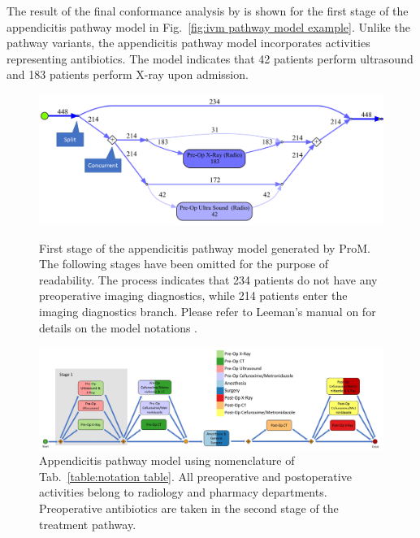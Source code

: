 The result of the final conformance analysis by  is shown for the first stage of the appendicitis
pathway model in Fig.~\ref{fig:ivm pathway model example}.
Unlike the pathway variants, the appendicitis pathway model incorporates activities representing antibiotics. The model indicates that 42 patients perform ultrasound and 183 patients perform X-ray upon admission. 

\begin{figure}[t]
\includegraphics[width=\textwidth]{images/ivm_appendicitis_first_stage_example.png}
\caption{First stage of the appendicitis pathway model generated by
  ProM. The following stages have been omitted for the purpose of
  readability.
  The process indicates that 234 patients do not have any preoperative
  imaging diagnostics, while 214 patients enter the imaging
  diagnostics branch.
  Please refer to Leeman's manual on  for details on the model notations \cite{leemansinductive}.}
\label{fig:ivm pathway model example}

\includegraphics[width=\textwidth]{images/communicative_appendicitis_process_models_anes.jpg}
\caption{Appendicitis pathway model using nomenclature of Tab.~\ref{table:notation table}. All preoperative and
  postoperative activities belong to radiology and pharmacy
  departments. Preoperative antibiotics are taken in the second stage
  of the treatment pathway.}
\label{fig:appendicitis pathway model}
\end{figure}

